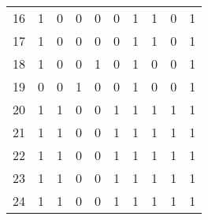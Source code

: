 \begin{longtable}{cp{1.5cm}p{1.5cm}p{1.5cm}p{1.5cm}p{1.5cm}p{1.5cm}p{1.5cm}p{1.5cm}p{1.5cm}}
16 &                          1 &                             0 &                          0 &                        0 &                           0 &                        1 &                         1 &                            0 &                         1 \\
17 &                          1 &                             0 &                          0 &                        0 &                           0 &                        1 &                         1 &                            0 &                         1 \\
18 &                          1 &                             0 &                          0 &                        1 &                           0 &                        1 &                         0 &                            0 &                         1 \\
19 &                          0 &                             0 &                          1 &                        0 &                           0 &                        1 &                         0 &                            0 &                         1 \\
20 &                          1 &                             1 &                          0 &                        0 &                           1 &                        1 &                         1 &                            1 &                         1 \\
21 &                          1 &                             1 &                          0 &                        0 &                           1 &                        1 &                         1 &                            1 &                         1 \\
22 &                          1 &                             1 &                          0 &                        0 &                           1 &                        1 &                         1 &                            1 &                         1 \\
23 &                          1 &                             1 &                          0 &                        0 &                           1 &                        1 &                         1 &                            1 &                         1 \\
24 &                          1 &                             1 &                          0 &                        0 &                           1 &                        1 &                         1 &                            1 &                         1 \\

\end{longtable}
